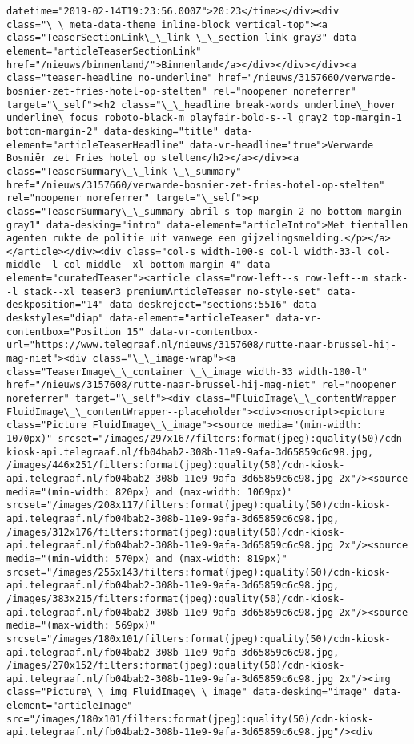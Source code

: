 \documentclass[11pt]{article}
\begin{document}
\begin{Verbatim}[commandchars=\\\{\}]
datetime="2019-02-14T19:23:56.000Z">20:23</time></div><div class="\_\_meta-data-theme inline-block vertical-top"><a class="TeaserSectionLink\_\_link \_\_section-link gray3" data-element="articleTeaserSectionLink" href="/nieuws/binnenland/">Binnenland</a></div></div></div><a class="teaser-headline no-underline" href="/nieuws/3157660/verwarde-bosnier-zet-fries-hotel-op-stelten" rel="noopener noreferrer" target="\_self"><h2 class="\_\_headline break-words underline\_hover underline\_focus roboto-black-m playfair-bold-s--l gray2 top-margin-1 bottom-margin-2" data-desking="title" data-element="articleTeaserHeadline" data-vr-headline="true">Verwarde Bosniër zet Fries hotel op stelten</h2></a></div><a class="TeaserSummary\_\_link \_\_summary" href="/nieuws/3157660/verwarde-bosnier-zet-fries-hotel-op-stelten" rel="noopener noreferrer" target="\_self"><p class="TeaserSummary\_\_summary abril-s top-margin-2 no-bottom-margin gray1" data-desking="intro" data-element="articleIntro">Met tientallen agenten rukte de politie uit vanwege een gijzelingsmelding.</p></a></article></div><div class="col-s width-100-s col-l width-33-l col-middle--l col-middle--xl bottom-margin-4" data-element="curatedTeaser"><article class="row-left--s row-left--m stack--l stack--xl teaser3 premiumArticleTeaser no-style-set" data-deskposition="14" data-deskreject="sections:5516" data-deskstyles="diap" data-element="articleTeaser" data-vr-contentbox="Position 15" data-vr-contentbox-url="https://www.telegraaf.nl/nieuws/3157608/rutte-naar-brussel-hij-mag-niet"><div class="\_\_image-wrap"><a class="TeaserImage\_\_container \_\_image width-33 width-100-l" href="/nieuws/3157608/rutte-naar-brussel-hij-mag-niet" rel="noopener noreferrer" target="\_self"><div class="FluidImage\_\_contentWrapper FluidImage\_\_contentWrapper--placeholder"><div><noscript><picture class="Picture FluidImage\_\_image"><source media="(min-width: 1070px)" srcset="/images/297x167/filters:format(jpeg):quality(50)/cdn-kiosk-api.telegraaf.nl/fb04bab2-308b-11e9-9afa-3d65859c6c98.jpg, /images/446x251/filters:format(jpeg):quality(50)/cdn-kiosk-api.telegraaf.nl/fb04bab2-308b-11e9-9afa-3d65859c6c98.jpg 2x"/><source media="(min-width: 820px) and (max-width: 1069px)" srcset="/images/208x117/filters:format(jpeg):quality(50)/cdn-kiosk-api.telegraaf.nl/fb04bab2-308b-11e9-9afa-3d65859c6c98.jpg, /images/312x176/filters:format(jpeg):quality(50)/cdn-kiosk-api.telegraaf.nl/fb04bab2-308b-11e9-9afa-3d65859c6c98.jpg 2x"/><source media="(min-width: 570px) and (max-width: 819px)" srcset="/images/255x143/filters:format(jpeg):quality(50)/cdn-kiosk-api.telegraaf.nl/fb04bab2-308b-11e9-9afa-3d65859c6c98.jpg, /images/383x215/filters:format(jpeg):quality(50)/cdn-kiosk-api.telegraaf.nl/fb04bab2-308b-11e9-9afa-3d65859c6c98.jpg 2x"/><source media="(max-width: 569px)" srcset="/images/180x101/filters:format(jpeg):quality(50)/cdn-kiosk-api.telegraaf.nl/fb04bab2-308b-11e9-9afa-3d65859c6c98.jpg, /images/270x152/filters:format(jpeg):quality(50)/cdn-kiosk-api.telegraaf.nl/fb04bab2-308b-11e9-9afa-3d65859c6c98.jpg 2x"/><img class="Picture\_\_img FluidImage\_\_image" data-desking="image" data-element="articleImage" src="/images/180x101/filters:format(jpeg):quality(50)/cdn-kiosk-api.telegraaf.nl/fb04bab2-308b-11e9-9afa-3d65859c6c98.jpg"/><div 
\end{Verbatim}
\end{document}
